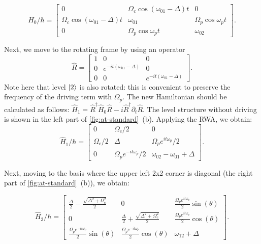 \documentclass[%
 pra,
 amsmath,amssymb,
 reprint,%
]{revtex4-1}
\begin{document}
\begin{equation*}
\hat H_0/\hbar = \left[\begin{matrix}
0 & \Omega_{c} \cos{\left(\omega_{01}- \Delta \right)t} & 0\\
\Omega_{c} \cos{\left(\omega_{01} - \Delta \right)t}   & \omega_{01} &\Omega_{p} \cos\omega_p t  \\
0 & \Omega_{p} \cos{\omega_p t}  & \omega_{02}\end{matrix}\right].
\end{equation*}

Next, we move to the rotating frame by using an operator
\[
\hat R = \left[\begin{matrix} 
1 & 0 & 0\\0 & e^{- i t \left(\omega_{01}- \Delta\right)} & 0\\0 & 0 & e^{- i t \left(\omega_{01}- \Delta\right)}\end{matrix}\right].
\]
Note here that level $\ket{2}$ is also rotated: this is convenient to preserve the frequency of the driving term with $\Omega_p$. The new Hamiltonian should be calculated as follows: $\hat H_1 = \hat R^\dag \hat H_0 \hat R - i \hat{R}^\dag \partial_t  \hat R$. The level structure without driving  is shown in the left part of \autoref{fig:at-standard}~(b). Applying the RWA, we obtain:
\begin{equation*}
\hat H_1/\hbar = \left[\begin{matrix}0 &\Omega_{c}/2 & 0\\\Omega_{c}/2 & \Delta & \Omega_{p} e^{i t \omega_p}/2\\0 & \Omega_{p} e^{-i t \omega_p}/2 & \omega_{02} - \omega_{01}+\Delta \end{matrix}\right].
\end{equation*}

Next, moving to the basis where the upper left 2x2 corner is diagonal (the right part of \autoref{fig:at-standard}~(b)), we obtain:

\begin{equation*}
\hat H_3/\hbar = \left[\begin{matrix} 
\frac{\Delta}{2} - \frac{\sqrt{\Delta^{2} + \Omega_{c}^{2}}}{2} & 
0 &
\frac{\Omega_{p} e^{i t \omega_{p}}}{2}\sin(\theta)
\\
0 & 
\frac{\Delta}{2} + \frac{\sqrt{\Delta^{2} + \Omega_{c}^{2}}}{2} & 
\frac{\Omega_{p} e^ {i t \omega_p}}{2}\cos(\theta)
\\
\frac{\Omega_{p} e^{-i t \omega_{p}} }{2}\sin(\theta) & 
\frac{\Omega_{p} e^{-i t \omega_{p}}}{2} \cos(\theta) & 
\omega_{12} +\Delta 
\end{matrix}\right].
\end{equation*}
\end{document}
